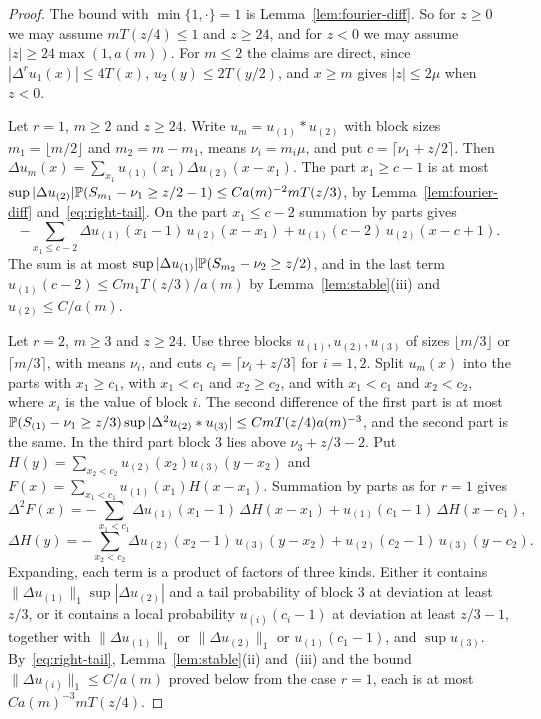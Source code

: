 \begin{proof}
The bound with $\min\{1,\cdot\}=1$ is Lemma~\ref{lem:fourier-diff}. So for $z\ge0$ we may assume
$mT(z/4)\le1$ and $z\ge24$, and for $z<0$ we may assume $|z|\ge24\max(1,a(m))$. For $m\le2$ the
claims are direct, since $|\Delta^ru_1(x)|\le4T(x)$, $u_2(y)\le2T(y/2)$, and $x\ge m$ gives
$|z|\le2\mu$ when $z<0$.

Let $r=1$, $m\ge2$ and $z\ge24$. Write $u_m=u_{(1)}*u_{(2)}$ with block sizes $m_1=\lfloor m/2\rfloor$
and $m_2=m-m_1$, means $\nu_i=m_i\mu$, and put $c=\lceil\nu_1+z/2\rceil$. Then
$\Delta u_m(x)=\sum_{x_1}u_{(1)}(x_1)\Delta u_{(2)}(x-x_1)$. The part $x_1\ge c-1$ is at most
$\sup|\Delta u_{(2)}|\mathbb{P}(S_{m_1}-\nu_1\ge z/2-1)\le Ca(m)^{-2}mT(z/3)$, by
Lemma~\ref{lem:fourier-diff} and~\eqref{eq:right-tail}. On the part $x_1\le c-2$ summation by parts
gives
\[
 -\sum_{x_1\le c-2}\Delta u_{(1)}(x_1-1)\,u_{(2)}(x-x_1)+u_{(1)}(c-2)\,u_{(2)}(x-c+1).
\]
The sum is at most $\sup|\Delta u_{(1)}|\mathbb{P}(S_{m_2}-\nu_2\ge z/2)$, and in the last term
$u_{(1)}(c-2)\le Cm_1T(z/3)/a(m)$ by Lemma~\ref{lem:stable}(iii) and $u_{(2)}\le C/a(m)$.

Let $r=2$, $m\ge3$ and $z\ge24$. Use three blocks $u_{(1)},u_{(2)},u_{(3)}$ of sizes
$\lfloor m/3\rfloor$ or $\lceil m/3\rceil$, with means $\nu_i$, and cuts
$c_i=\lceil\nu_i+z/3\rceil$ for $i=1,2$. Split $u_m(x)$ into the parts with $x_1\ge c_1$, with
$x_1<c_1$ and $x_2\ge c_2$, and with $x_1<c_1$ and $x_2<c_2$, where $x_i$ is the value of block $i$.
The second difference of the first part is at most
$\mathbb{P}(S_{(1)}-\nu_1\ge z/3)\sup|\Delta^2u_{(2)}*u_{(3)}|\le CmT(z/4)a(m)^{-3}$, and the second
part is the same. In the third part block $3$ lies above $\nu_3+z/3-2$. Put
$H(y)=\sum_{x_2<c_2}u_{(2)}(x_2)u_{(3)}(y-x_2)$ and $F(x)=\sum_{x_1<c_1}u_{(1)}(x_1)H(x-x_1)$.
Summation by parts as for $r=1$ gives
\[
 \Delta^2F(x)=-\sum_{x_1<c_1}\Delta u_{(1)}(x_1-1)\,\Delta H(x-x_1)+u_{(1)}(c_1-1)\,\Delta H(x-c_1),
\]
\[
 \Delta H(y)=-\sum_{x_2<c_2}\Delta u_{(2)}(x_2-1)\,u_{(3)}(y-x_2)+u_{(2)}(c_2-1)\,u_{(3)}(y-c_2).
\]
Expanding, each term is a product of factors of three kinds. Either it contains
$\|\Delta u_{(1)}\|_1\sup|\Delta u_{(2)}|$ and a tail probability of block $3$ at deviation at
least $z/3$, or it contains a local probability $u_{(i)}(c_i-1)$ at deviation at least $z/3-1$,
together with $\|\Delta u_{(1)}\|_1$ or $\|\Delta u_{(2)}\|_1$ or $u_{(1)}(c_1-1)$, and
$\sup u_{(3)}$. By~\eqref{eq:right-tail}, Lemma~\ref{lem:stable}(ii) and~(iii) and the bound
$\|\Delta u_{(i)}\|_1\le C/a(m)$ proved below from the case $r=1$, each is at most
$Ca(m)^{-3}mT(z/4)$.


\end{proof}
